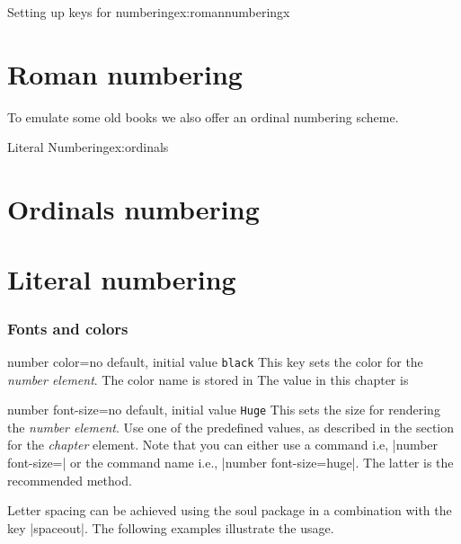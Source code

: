 \begin{decription}
{\begin{texexample}{Setting up keys for numbering}{ex:romannumberingx}
\chapter{Roman numbering}
\lorem
\egroup
\end{texexample}





To emulate some old books we also offer an ordinal numbering scheme.

\begin{texexample}{Literal Numbering}{ex:ordinals}
\chapter{Ordinals numbering}
\lorem
{}
\chapter{Literal numbering} 
\lorem
\end{texexample}


\subsection{Fonts and colors}
\begin{docKey}[phd]{number color}{=}{no default, initial value \texttt{black}}
This key sets the color for the \textit{number element}. The color name is stored in %
The value in this chapter is %
\end{docKey}

\begin{docKey}[phd]{number font-size}{=}{no default, initial value \texttt{Huge}}
This sets the size for rendering the \textit{number element}. Use one of the predefined values, as described
in the section for the \emph{chapter} element.
Note that you can either use a command i.e, |number font-size=|\cmd{\huge} 
or the command name i.e., |number font-size=huge|. The latter is the recommended method.
\end{docKey}

Letter spacing can be achieved using the soul package in a combination with the key |spaceout|.
The following examples illustrate the usage.


}
\end{decription}
